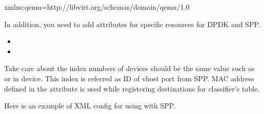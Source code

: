 \documentclass[a4paper,11pt,openany,oneside,english]{sphinxmanual}
\begin{document}
\begin{sphinxVerbatim}[commandchars=\\\{\},formatcom=\footnotesize]
xmlns:qemu=\PYGZsq{}http://libvirt.org/schemas/domain/qemu/1.0\PYGZsq{}
\end{sphinxVerbatim}

In addition, you need to add attributes for specific resources for DPDK and SPP.
\begin{itemize}
\item {} 

\item {} 

\end{itemize}

Take care about the index numbers of devices should be the same value such as
 or  in  device. This index is referred as
ID of vhost port from SPP. MAC address defined in the attribute is used while
registering destinations for classifier’s table.

\begin{sphinxVerbatim}[commandchars=\\\{\},formatcom=\footnotesize]
 
\end{sphinxVerbatim}

Here is an example of XML config for using with SPP.
\end{document}
